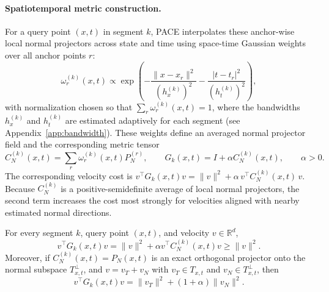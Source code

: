         \paragraph{Spatiotemporal metric construction.}
        For a query point \((x,t)\) in segment \(k\), PACE interpolates these anchor-wise local normal projectors across state and time using space-time Gaussian weights over all anchor points \(r\):
        \begin{equation}
            \label{eq:weights}
            \omega_r^{(k)}(x,t)
            \propto
            \exp\!\left(
            -\frac{\|x-x_r\|^2}{(h_x^{(k)})^2}
            -\frac{|t-t_r|^2}{(h_t^{(k)})^2}
            \right),
        \end{equation}
        with normalization chosen so that \(\sum_r\omega_r^{(k)}(x,t)=1\), where the bandwidths \(h_x^{(k)}\) and \(h_t^{(k)}\) are estimated adaptively for each segment (see Appendix~\ref{app:bandwidth}).
        These weights define an averaged normal projector field and the corresponding metric tensor
        \[
        C_N^{(k)}(x,t)=\sum_r \omega_r^{(k)}(x,t)P_N^{(r)}, \qquad G_k(x,t)=I+\alpha C_N^{(k)}(x,t),\qquad \alpha>0.
        \]
        The corresponding velocity cost is \(v^\top G_k(x,t)v = \|v\|^2 + \alpha\, v^\top C_N^{(k)}(x,t)\,v\). Because \(C_N^{(k)}\) is a positive-semidefinite average of local normal projectors, the second term increases the cost most strongly for velocities aligned with nearby estimated normal directions.


        
        \begin{proposition}
        \label{prop:metric}
        For every segment \(k\), query point \((x,t)\), and velocity \(v\in\mathbb{R}^d\),
        \begin{equation}
        \label{eq:metric-psd}
        v^\top G_k(x,t)v
        =
        \|v\|^2
        +
        \alpha v^\top C_N^{(k)}(x,t)v
        \ge
        \|v\|^2.
        \end{equation}
        Moreover, if \(C_N^{(k)}(x,t)=P_N(x,t)\) is an exact orthogonal projector onto the normal subspace \(T_{x,t}^{\perp}\), and \(v=v_T+v_N\) with \(v_T\in T_{x,t}\) and \(v_N\in T_{x,t}^{\perp}\), then
        \begin{equation}
        \label{eq:tangent-normal-cost}
        v^\top G_k(x,t)v
        =
        \|v_T\|^2
        +
        (1+\alpha)\|v_N\|^2.
        \end{equation}
        \end{proposition}
        
